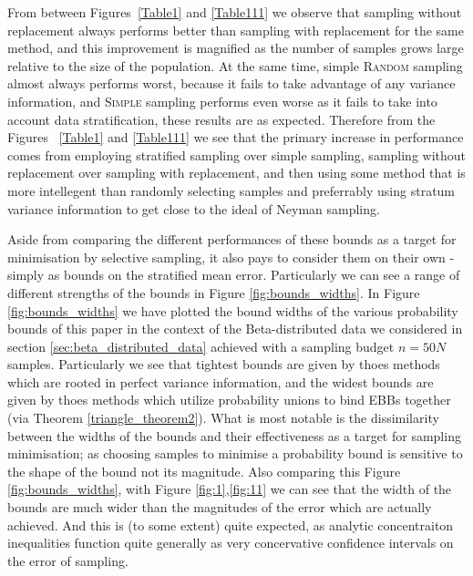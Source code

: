 From between Figures~\ref{Table1} and \ref{Table111} we observe that sampling without replacement always performs better than sampling with replacement for the same method, and this improvement is magnified as the number of samples grows large relative to the size of the population. 
At the same time, simple \textsc{Random} sampling almost always performs worst, because it fails to take advantage of any variance information, and \textsc{Simple} sampling performs even worse as it fails to take into account data stratification, these results are as expected.
Therefore from the Figures ~\ref{Table1} and \ref{Table111} we see that the primary increase in performance comes from employing stratified sampling over simple sampling, sampling without replacement over sampling with replacement, and then using some method that is more intellegent than randomly selecting samples and preferrably using stratum variance information to get close to the ideal of Neyman sampling.

Aside from comparing the different performances of these bounds as a target for minimisation by selective sampling, it also pays to consider them on their own - simply as bounds on the stratified mean error.
Particularly we can see a range of different strengths of the bounds in Figure \ref{fig:bounds_widths}.
In Figure \ref{fig:bounds_widths} we have plotted the bound widths of the various probability bounds of this paper in the context of the Beta-distributed data we considered in section \ref{sec:beta_distributed_data} achieved with a sampling budget $n=50N$ samples.
Particularly we see that tightest bounds are given by thoes methods which are rooted in perfect variance information, and the widest bounds are given by thoes methods which utilize probability unions to bind EBBs together (via Theorem \ref{triangle_theorem2}).
What is most notable is the dissimilarity between the widths of the bounds and their effectiveness as a target for sampling minimisation; as choosing samples to minimise a probability bound is sensitive to the shape of the bound not its magnitude.
Also comparing this Figure \ref{fig:bounds_widths}, with Figure \ref{fig:1},\ref{fig:11} we can see that the width of the bounds are much wider than the magnitudes of the error which are actually achieved.
And this is (to some extent) quite expected, as analytic concentraiton inequalities function quite generally as very concervative confidence intervals on the error of sampling.


